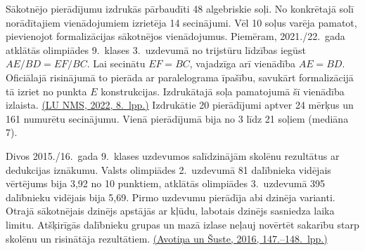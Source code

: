 Sākotnējo pierādījumu izdrukās pārbaudīti 48 algebriskie soļi. No konkrētajā solī norādītajiem vienādojumiem izrietēja 14 secinājumi. Vēl 10 soļus varēja pamatot, pievienojot formalizācijas sākotnējos vienādojumus. Piemēram, 2021./22.~gada atklātās olimpiādes 9.~klases 3.~uzdevumā no trijstūru līdzības iegūst $AE/BD=EF/BC$. Lai secinātu $EF=BC$, vajadzīga arī vienādība $AE=BD$. Oficiālajā risinājumā to pierāda ar paralelograma īpašību, savukārt formalizācijā tā izriet no punkta $E$ konstrukcijas. Izdrukātajā soļa pamatojumā šī vienādība izlaista. \href{https://www.nms.lu.lv/fileadmin/user_upload/lu_portal/projekti/nms.lu.lv/Arhivs/Olimpiades/AMO/2020-2030/2022_AMO_uzd_atr.pdf\#page=8}{(LU NMS, 2022, 8.~lpp.)} Izdrukātie 20 pierādījumi aptver 24 mērķus un 161 numurētu secinājumu. Vienā pierādījumā bija no 3 līdz 21 soļiem (mediāna 7).

Divos 2015./16.~gada 9.~klases uzdevumos salīdzinājām skolēnu rezultātus ar dedukcijas iznākumu. Valsts olimpiādes 2.~uzdevumā 81 dalībnieka vidējais vērtējums bija 3,92 no 10 punktiem, atklātās olimpiādes 3.~uzdevumā 395 dalībnieku vidējais bija 5,69. Pirmo uzdevumu pierādīja abi dzinēja varianti. Otrajā sākotnējais dzinējs apstājās ar kļūdu, labotais dzinējs sasniedza laika limitu. Atšķirīgās dalībnieku grupas un mazā izlase neļauj novērtēt sakarību starp skolēnu un risinātāja rezultātiem. \href{https://www.nms.lu.lv/fileadmin/user_upload/lu_portal/projekti/nms.lu.lv/Gramatas/Uzd_krajumi/Mat_Sac_4-9_15-16_2016.pdf\#page=147}{(Avotiņa un Šuste, 2016, 147.--148.~lpp.)}
